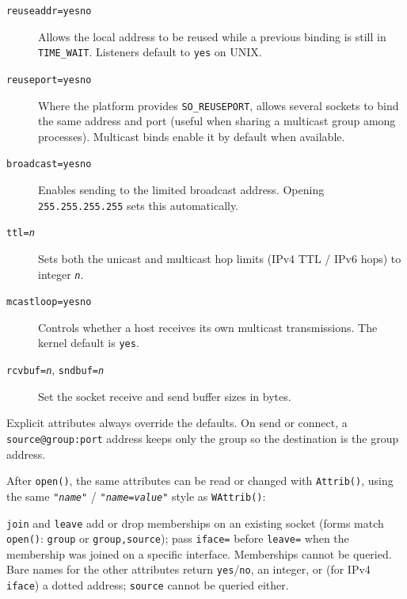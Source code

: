 \begin{description}
\item[\texttt{reuseaddr=yes{\textbar}no}]
Allows the local address to be reused while a previous binding is
still in \texttt{TIME\_WAIT}. Listeners default to \texttt{yes} on
UNIX.
\item[\texttt{reuseport=yes{\textbar}no}]
Where the platform provides \texttt{SO\_REUSEPORT}, allows several
sockets to bind the same address and port (useful when sharing a
multicast group among processes). Multicast binds enable it by
default when available.
\item[\texttt{broadcast=yes{\textbar}no}]
Enables sending to the limited broadcast address. Opening
\texttt{255.255.255.255} sets this automatically.
\item[\texttt{ttl=\textit{n}}]
Sets both the unicast and multicast hop limits (IPv4 TTL /
IPv6 hops) to integer \texttt{\textit{n}}.
\item[\texttt{mcastloop=yes{\textbar}no}]
Controls whether a host receives its own multicast transmissions.
The kernel default is \texttt{yes}.
\item[\texttt{rcvbuf=\textit{n}}, \texttt{sndbuf=\textit{n}}]
Set the socket receive and send buffer sizes in bytes.
\end{description}

Explicit attributes always override the defaults. On send or connect,
a \texttt{source@group:port} address keeps only the group so the
destination is the group address.

After \texttt{open()}, the same attributes can be read or changed with
\texttt{Attrib()}, using the same
\texttt{"\textit{name}"} / \texttt{"\textit{name}=\textit{value}"} style
as \texttt{WAttrib()}:


\texttt{join} and \texttt{leave} add or drop memberships on an existing
socket (forms match \texttt{open()}: \texttt{group} or
\texttt{group,source}); pass \texttt{iface=} before \texttt{leave=}
when the membership was joined on a specific interface. Memberships
cannot be queried. Bare names for the other attributes return
\texttt{yes}/\texttt{no}, an integer, or (for IPv4 \texttt{iface}) a
dotted address; \texttt{source} cannot be queried either.

